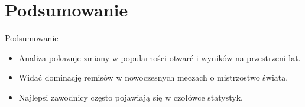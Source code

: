 \documentclass{beamer}
\begin{document}
\section{Podsumowanie}
\begin{frame}{Podsumowanie}
  \begin{itemize}
    \item Analiza pokazuje zmiany w popularności otwarć i wyników na przestrzeni lat.
    \item Widać dominację remisów w nowoczesnych meczach o mistrzostwo świata.
    \item Najlepsi zawodnicy często pojawiają się w czołówce statystyk.
  \end{itemize}
\end{frame}
\end{document}
